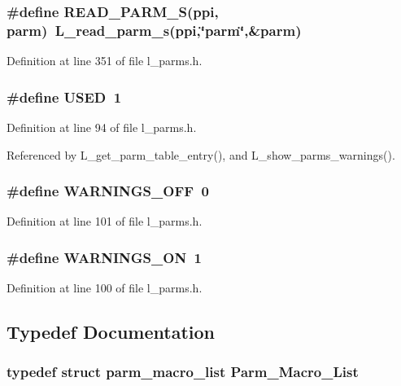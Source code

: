 \subsubsection{\setlength{\rightskip}{0pt plus 5cm}\#define READ\_\-PARM\_\-S(ppi, parm)~L\_\-read\_\-parm\_\-s(ppi,\char`\"{}parm\char`\"{},\&parm)}\label{l__parms_8h_e4dcaeb2542f2f2c07d27ea936b178ad}




Definition at line 351 of file l\_\-parms.h.
\subsubsection{\setlength{\rightskip}{0pt plus 5cm}\#define USED~1}\label{l__parms_8h_bcd0a22ee4346cad5706adb6d2119429}




Definition at line 94 of file l\_\-parms.h.

Referenced by L\_\-get\_\-parm\_\-table\_\-entry(), and L\_\-show\_\-parms\_\-warnings().
\subsubsection{\setlength{\rightskip}{0pt plus 5cm}\#define WARNINGS\_\-OFF~0}\label{l__parms_8h_8958ac36a82de9378c6cac257a5c0265}




Definition at line 101 of file l\_\-parms.h.
\subsubsection{\setlength{\rightskip}{0pt plus 5cm}\#define WARNINGS\_\-ON~1}\label{l__parms_8h_491e4f969739dfdd5d018c6d259141f2}




Definition at line 100 of file l\_\-parms.h.

\subsection{Typedef Documentation}
\subsubsection{\setlength{\rightskip}{0pt plus 5cm}typedef struct \bf{parm\_\-macro\_\-list}
 \bf{Parm\_\-Macro\_\-List}}\label{l__parms_8h_3dc42992137d6494c24c05d59e0ad364}


